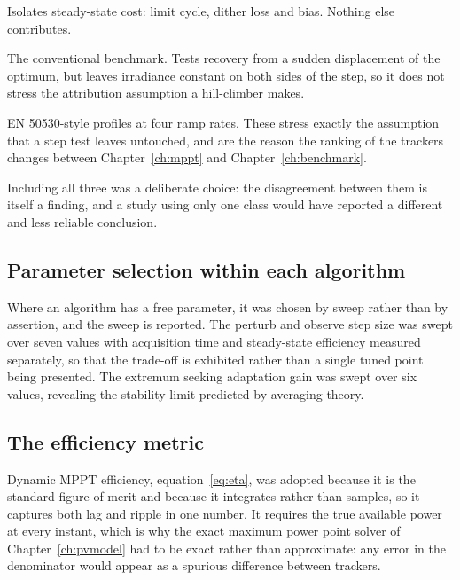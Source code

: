 \begin{description}[leftmargin=0pt, style=unboxed]
\item[Constant irradiance.] Isolates steady-state cost: limit cycle, dither loss
  and bias. Nothing else contributes.
\item[Step change.] The conventional benchmark. Tests recovery from a sudden
  displacement of the optimum, but leaves irradiance constant on both sides of
  the step, so it does not stress the attribution assumption a hill-climber
  makes.
\item[Trapezoidal ramps.] EN 50530-style profiles at four ramp rates. These
  stress exactly the assumption that a step test leaves untouched, and are the
  reason the ranking of the trackers changes between
  Chapter~\ref{ch:mppt} and Chapter~\ref{ch:benchmark}.
\end{description}

Including all three was a deliberate choice: the disagreement between them is
itself a finding, and a study using only one class would have reported a
different and less reliable conclusion.

\subsection{Parameter selection within each algorithm}

Where an algorithm has a free parameter, it was chosen by sweep rather than by
assertion, and the sweep is reported. The perturb and observe step size was
swept over seven values with acquisition time and steady-state efficiency
measured separately, so that the trade-off is exhibited rather than a single
tuned point being presented. The extremum seeking adaptation gain was swept over
six values, revealing the stability limit predicted by averaging theory.

\subsection{The efficiency metric}

Dynamic MPPT efficiency, equation~\eqref{eq:eta}, was adopted because it is the
standard figure of merit and because it integrates rather than samples, so it
captures both lag and ripple in one number. It requires the true available power
at every instant, which is why the exact maximum power point solver of
Chapter~\ref{ch:pvmodel} had to be exact rather than approximate: any error in
the denominator would appear as a spurious difference between trackers.

